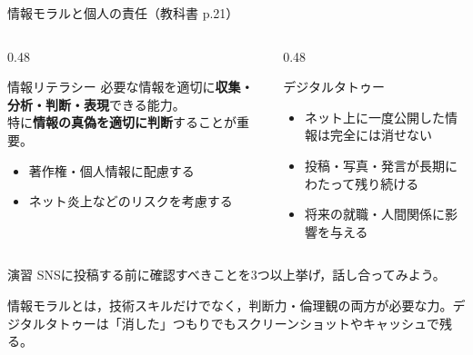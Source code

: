 \documentclass[aspectratio=43,professionalfonts,handout,10pt]{beamer}
\begin{document}

\begin{frame}{情報モラルと個人の責任（教科書 p.21）}
  \begin{columns}[T]
    \begin{column}{0.48\textwidth}
      \begin{block}{情報リテラシー}
        \small
        必要な情報を適切に\textbf{収集・分析・判断・表現}できる能力。\\
        特に\textbf{情報の真偽を適切に判断}することが重要。
        \begin{itemize}
          \item 著作権・個人情報に配慮する
          \item ネット炎上などのリスクを考慮する
        \end{itemize}
      \end{block}
    \end{column}
    \begin{column}{0.48\textwidth}
      \begin{alertblock}{デジタルタトゥー}
        \small
        \begin{itemize}
          \item ネット上に一度公開した情報は完全には消せない
          \item 投稿・写真・発言が長期にわたって残り続ける
          \item 将来の就職・人間関係に影響を与える
        \end{itemize}
      \end{alertblock}
    \end{column}
  \end{columns}

  \begin{exampleblock}{演習}
    SNSに投稿する前に確認すべきことを3つ以上挙げ，話し合ってみよう。
  \end{exampleblock}

  \begin{slidenote}
    情報モラルとは，技術スキルだけでなく，判断力・倫理観の両方が必要な力。デジタルタトゥーは「消した」つもりでもスクリーンショットやキャッシュで残る。
  \end{slidenote}
\end{frame}

\end{document}
